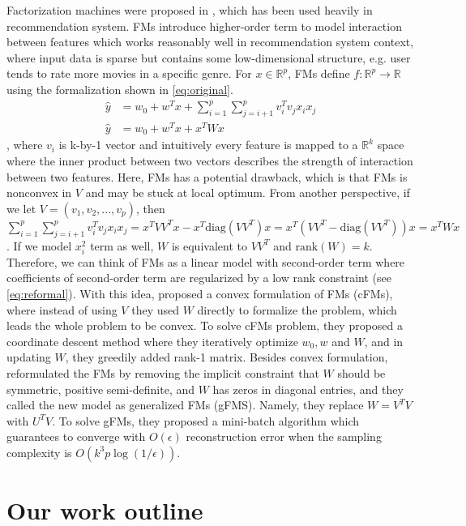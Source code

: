 \documentclass{article}
\newcommand{\diag}{\text{diag}}
\newcommand{\rank}{\text{rank}}
\begin{document}
Factorization machines were proposed in \cite{FM_paper}, which has been used heavily in recommendation system. FMs introduce higher-order term to model interaction between features which works reasonably well in recommendation system context, where input data is sparse but contains some low-dimensional structure, e.g. user tends to rate more movies in a specific genre. For $x \in \mathbb{R}^p$, FMs define $f: \mathbb{R}^p \rightarrow \mathbb{R}$ using the formalization shown in \cref{eq:original}. 
\begin{align}
  \hat{y} &= w_0 + w^T x + \sum_{i = 1}^p\sum_{j = i + 1}^p v_i^T v_j x_i x_j \label{eq:original} \\
  \hat{y} &= w_0 + w^T x + x^T W x \label{eq:reformal}
\end{align}
, where $v_i$ is k-by-1 vector and intuitively every feature is mapped to a $\mathbb{R}^k$ space where the inner product between two vectors describes the strength of interaction between two features. Here, FMs has a potential drawback, which is that FMs is nonconvex in $V$ and may be stuck at local optimum. From another perspective, if we let $V = (v_1, v_2, ..., v_p)$, then $\sum_{i = 1}^p\sum_{j = i + 1}^p v_i^T v_j x_i x_j = x^T V V^T x - x^T \diag(V V^T) x = x^T (V V^T -  \diag(V V^T))  x = x^T W x$. If we model $x_i^2$ term as well, $W$ is equivalent to $VV^T$ and $\rank(W) = k$. Therefore, we can think of FMs as a linear model with second-order term where coefficients of second-order term are regularized by a low rank constraint (see \cref{eq:reformal}). With this idea, \cite{convexFM_paper} proposed a convex formulation of FMs (cFMs), where instead of using $V$ they used $W$ directly to formalize the problem, which leads the whole problem to be convex. To solve cFMs problem, they proposed a coordinate descent method where they iteratively optimize $w_0, w$ and $W$, and in updating $W$, they greedily added rank-1 matrix. Besides convex formulation, \cite{generalizedFM_paper} reformulated the FMs by removing the implicit constraint that $W$ should be symmetric, positive semi-definite, and $W$ has zeros in diagonal entries, and they called the new model as generalized FMs (gFMS). Namely, they replace $W = V^TV$ with $U^TV$. To solve gFMs, they proposed a mini-batch algorithm which guarantees to converge with $O(\epsilon)$ reconstruction error when the sampling complexity is $O(k^3p \log(1/\epsilon))$. 


\section{Our work outline}
\end{document}
